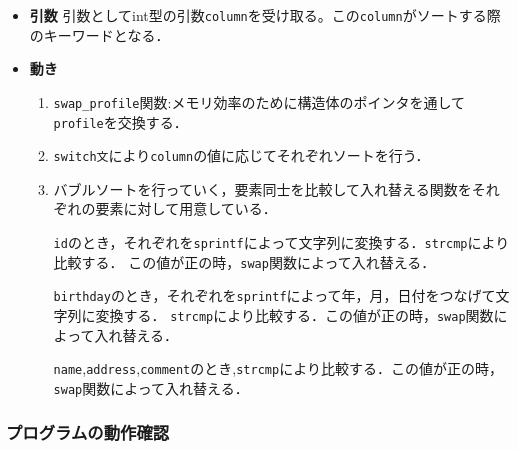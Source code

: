   \begin{itemize}
    \item \textbf{引数} 引数としてint型の引数\texttt{column}を受け取る。この\texttt{column}がソートする際のキーワードとなる．
    \item \textbf{動き}
    \begin{enumerate}
      \item \texttt{swap\_profile}関数:メモリ効率のために構造体のポインタを通して\texttt{profile}を交換する．
      \item \texttt{switch文}により\texttt{column}の値に応じてそれぞれソートを行う．
      \item バブルソートを行っていく，要素同士を比較して入れ替える関数をそれぞれの要素に対して用意している．
            
            \texttt{id}のとき，それぞれを\texttt{sprintf}によって文字列に変換する．\texttt{strcmp}により比較する．
            この値が正の時，\texttt{swap}関数によって入れ替える．

            \texttt{birthday}のとき，それぞれを\texttt{sprintf}によって年，月，日付をつなげて文字列に変換する．
            \texttt{strcmp}により比較する．この値が正の時，\texttt{swap}関数によって入れ替える．

            \texttt{name},\texttt{address},\texttt{comment}のとき,\texttt{strcmp}により比較する．この値が正の時，\texttt{swap}関数によって入れ替える．
  
  
    \end{enumerate}
  \end{itemize}
  

    \subsubsection{プログラムの動作確認}

